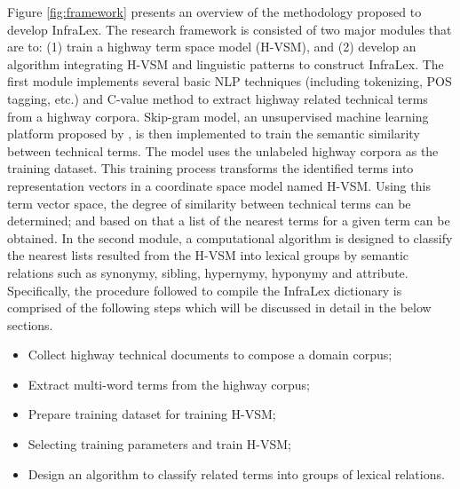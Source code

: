 \documentclass[Journal, InsideFigs, DoubleSpace]{ascelike} %
\begin{document}
\par
Figure \ref{fig:framework} presents an overview of the methodology proposed to develop InfraLex. The research framework is consisted of two major modules that are to: (1) train a highway term space model (H-VSM), and (2) develop an algorithm integrating H-VSM and linguistic patterns to construct InfraLex. The first module implements several basic NLP techniques (including tokenizing, POS tagging, etc.) and C-value \cite{frantzi20} method to extract highway related technical terms from a highway corpora. Skip-gram model, an unsupervised machine learning platform proposed by \cite{mikolov13a}, is then implemented to train the semantic similarity between technical terms. The model uses the unlabeled highway corpora as the training dataset. This training process transforms the identified terms into representation vectors in a coordinate space model named H-VSM.  Using this term vector space, the degree of similarity between technical terms can be determined; and based on that a list of the nearest terms for a given term can be obtained. In the second module, a computational algorithm is designed to classify the nearest lists resulted from the H-VSM into lexical groups by semantic relations such as synonymy, sibling, hypernymy, hyponymy and attribute. Specifically, the procedure followed to compile the InfraLex dictionary is comprised of the following steps which will be discussed in detail in the below sections.
\begin{itemize}
\item Collect highway technical documents to compose a domain corpus;
\item Extract multi-word terms from the highway corpus;
\item Prepare training dataset for training H-VSM;
\item Selecting training parameters and train H-VSM;
\item Design an algorithm to classify related terms into groups of lexical relations.
\end{itemize}

%
%
%
\end{document}
